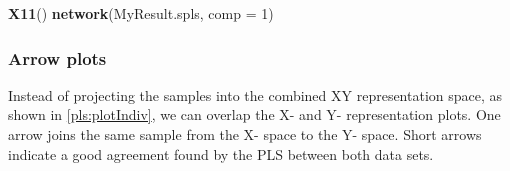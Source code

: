 \documentclass[]{book}
\newenvironment{Shaded}{\begin{snugshade}}{\end{snugshade}}
\newcommand{\CommentTok}[1]{\textcolor[rgb]{0.56,0.35,0.01}{\textit{#1}}}
\newcommand{\DataTypeTok}[1]{\textcolor[rgb]{0.13,0.29,0.53}{#1}}
\newcommand{\DecValTok}[1]{\textcolor[rgb]{0.00,0.00,0.81}{#1}}
\newcommand{\FloatTok}[1]{\textcolor[rgb]{0.00,0.00,0.81}{#1}}
\newcommand{\KeywordTok}[1]{\textcolor[rgb]{0.13,0.29,0.53}{\textbf{#1}}}
\newcommand{\NormalTok}[1]{#1}
\newcommand{\OperatorTok}[1]{\textcolor[rgb]{0.81,0.36,0.00}{\textbf{#1}}}
\newcommand{\OtherTok}[1]{\textcolor[rgb]{0.56,0.35,0.01}{#1}}
\newcommand{\StringTok}[1]{\textcolor[rgb]{0.31,0.60,0.02}{#1}}
\begin{document}
\begin{Shaded}
\begin{Highlighting}[]
\KeywordTok{X11}\NormalTok{()}
\KeywordTok{network}\NormalTok{(MyResult.spls, }\DataTypeTok{comp =} \DecValTok{1}\NormalTok{)}
\end{Highlighting}
\end{Shaded}

\begin{Shaded}
\end{Shaded}

\hypertarget{arrow-plots}{%
\subsubsection{Arrow plots}\label{arrow-plots}}

Instead of projecting the samples into the combined XY representation space, as shown in \ref{pls:plotIndiv}, we can overlap the X- and Y- representation plots. One arrow joins the same sample from the X- space to the Y- space. Short arrows indicate a good agreement found by the PLS between both data sets.

\begin{Shaded}
\end{Shaded}
\end{document}
